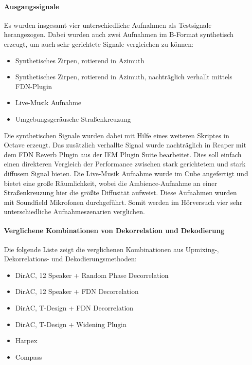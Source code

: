 \paragraph{Ausgangssignale}
Es wurden insgesamt vier unterschiedliche Aufnahmen als Testsignale herangezogen. Dabei wurden auch zwei Aufnahmen im B-Format synthetisch erzeugt, um auch sehr gerichtete Signale vergleichen zu können:

\begin{itemize}
	\item Synthetisches Zirpen, rotierend in Azimuth
	\item Synthetisches Zirpen, rotierend in Azimuth, nachträglich verhallt mittels FDN-Plugin
	\item Live-Musik Aufnahme
	\item Umgebungsgeräusche Straßenkreuzung
\end{itemize}

Die synthetischen Signale wurden dabei mit Hilfe eines weiteren Skriptes in Octave erzeugt. Das zusätzlich verhallte Signal wurde nachträglich in Reaper mit dem FDN Reverb Plugin aus der IEM Plugin Suite bearbeitet. Dies soll einfach einen direkteren Vergleich der Performance zwischen stark gerichtetem und stark diffusem Signal bieten. Die Live-Musik Aufnahme wurde im Cube angefertigt und bietet eine große Räumlichkeit, wobei die Ambience-Aufnahme an einer Straßenkreuzung hier die größte Diffusität aufweist. Diese Aufnahmen wurden mit Soundfield Mikrofonen durchgeführt. Somit werden im Hörversuch vier sehr unterschiedliche Aufnahmeszenarien verglichen.

\paragraph{Verglichene Kombinationen von Dekorrelation und Dekodierung}

Die folgende Liste zeigt die verglichenen Kombinationen aus Upmixing-, Dekorrelations- und Dekodierungsmethoden:

\begin{itemize}
	\item DirAC, 12 Speaker + Random Phase Decorrelation
	\item DirAC, 12 Speaker + FDN Decorrelation
	\item DirAC, T-Design + FDN Decorrelation
	\item DirAC, T-Design + Widening Plugin
	\item Harpex
	\item Compass
\end{itemize}

